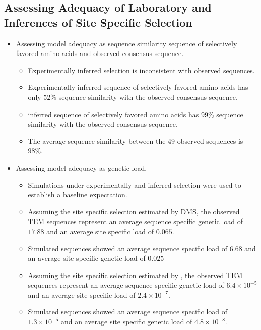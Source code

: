 \documentclass[12pt]{article}
\begin{document}
\subsection*{Assessing Adequacy of Laboratory and \selac Inferences of Site Specific Selection}
\begin{itemize}
	\item Assessing model adequacy as sequence similarity sequence of selectively favored amino acids and observed consensus sequence.
	\begin{itemize}
		\item Experimentally inferred selection is inconsistent with observed sequences.
		\item Experimentally inferred sequence of selectively favored amino acids has only $52 \%$ sequence similarity with the observed consensus sequence.
		\item \selac inferred sequence of selectively favored amino acids has $99 \%$ sequence similarity with the observed consensus sequence.
		\item The average sequence similarity between the 49 observed sequences is $98 \%$.
	\end{itemize}
	\item Assessing model adequacy as genetic load.
	\begin{itemize}
		\item Simulations under experimentally and \selac inferred selection were used to establish a baseline expectation.
		\item Assuming the site specific selection estimated by DMS, the observed TEM sequences represent an average sequence specific genetic load of $17.88$ and an average site specific load of $0.065$.
		\item Simulated sequences showed an average sequence specific load of $6.68$ and an average site specific genetic load of $0.025$
		\item Assuming the site specific selection estimated by \selac, the observed TEM sequences represent an average sequence specific genetic load of $6.4\times10^{-5}$ and an average site specific load of $2.4\times10^{-7}$.
		\item Simulated sequences showed an average sequence specific load of $1.3\times10^{-5}$ and an average site specific genetic load of $4.8\times10^{-8}$.
	\end{itemize}
\end{itemize}
\end{document}
